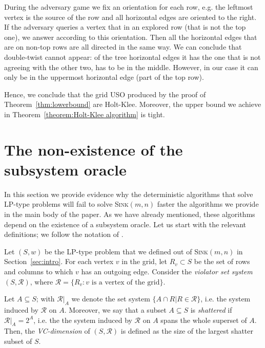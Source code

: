 \documentclass[runningheads,a4paper]{llncs}
\newcommand{\sinkmn}{\textsc{Sink}$(m,n)$\xspace}
\begin{document}
During the adversary game we fix an orientation for each row, e.g. the leftmost vertex is the source of the row and all horizontal edges are oriented 
to the right. If the adversary queries a vertex that in an explored row (that is not the top one), we answer according to this orientation.
Then all the horizontal edges that are on non-top rows are all directed in the same way. We can conclude that double-twist cannot appear:
of the tree horizontal edges it has the one that is not agreeing with the other two, has to be in the middle. However, in our case it can only 
be in the uppermost horizontal edge (part of the top row). 

Hence, we conclude that the grid USO produced by the proof of Theorem~\ref{thm:lowerbound} are Holt-Klee. Moreover, the 
upper bound we achieve in Theorem~\ref{theorem:Holt-Klee algorithm} is tight.



\section{The non-existence of the subsystem oracle} \label{app:nosubsystem}

In this section we provide evidence why the deterministic algorithms that solve LP-type problems \cite{chan16,ChazelleM96} will fail 
to solve \sinkmn faster the algorithms we provide in the main body of the paper. As we have already mentioned, these algorithms depend
on the existence of a subsystem oracle. Let us start with the relevant definitions; we follow the notation of \citet{ChazelleM96}.

Let $(S,w)$ be the LP-type problem that we defined out of \sinkmn in Section~\ref{sec:intro}.
For each vertex $v$ in the grid, let $R_v\subset S$ be the set of rows and columns to which $v$ has an outgoing edge. 
Consider the \emph{violator set system} $(S, \mathcal R)$, where $\mathcal R = \{R_v : v\text{ is a vertex of the grid}\}$. 

Let $A \subseteq S$; with $\mathcal R|_A$ we denote the set system $\{A \cap R| R \in \mathcal R\}$, i.e. the system induced
by $\mathcal R$ on $A$. Moreover, we say that a subset $A \subseteq S$ is \emph{shattered} if $\mathcal R|_A = 2^A$,
i.e. the the system induced by $\mathcal R $ on $A$ spans the whole superset of $A$.
Then, the \emph{VC-dimension} of $(S, \mathcal R)$ is defined as the size of the largest shatter subset of $S$. 
\end{document}

